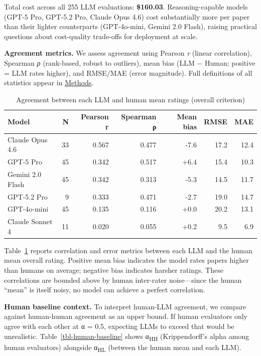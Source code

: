 \documentclass[
  11pt,
  letterpaper,
]{article}
\begin{document}
Total cost across all 255 LLM evaluations: \textbf{\$160.03}.
Reasoning-capable models (GPT-5 Pro, GPT-5.2 Pro, Claude Opus 4.6) cost
substantially more per paper than their lighter counterparts
(GPT-4o-mini, Gemini 2.0 Flash), raising practical questions about
cost-quality trade-offs for deployment at scale.

\textbf{Agreement metrics.} We assess agreement using Pearson \emph{r}
(linear correlation), Spearman \emph{ρ} (rank-based, robust to
outliers), mean bias (LLM − Human; positive = LLM rates higher), and
RMSE/MAE (error magnitude). Full definitions of all statistics appear in
\hyperref[methods]{Methods}.

\begin{longtable}[]{@{}lrrrrrr@{}}

\caption{\label{tbl-agreement}Agreement between each LLM and human mean
ratings (overall criterion)}

\tabularnewline

\toprule\noalign{}
Model & N & Pearson r & Spearman ρ & Mean bias & RMSE & MAE \\
\midrule\noalign{}
\endhead
\bottomrule\noalign{}
\endlastfoot
Claude Opus 4.6 & 33 & 0.567 & 0.477 & -7.6 & 17.2 & 12.4 \\
GPT-5 Pro & 45 & 0.342 & 0.517 & +6.4 & 15.4 & 10.3 \\
Gemini 2.0 Flash & 45 & 0.342 & 0.313 & -5.3 & 14.5 & 11.7 \\
GPT-5.2 Pro & 9 & 0.333 & 0.471 & -2.7 & 19.0 & 14.7 \\
GPT-4o-mini & 45 & 0.135 & 0.116 & +0.0 & 20.2 & 13.1 \\
Claude Sonnet 4 & 11 & 0.020 & 0.055 & +0.2 & 9.5 & 6.9 \\

\end{longtable}

Table~\ref{tbl-agreement} reports correlation and error metrics between
each LLM and the human mean overall rating. Positive mean bias indicates
the model rates papers higher than humans on average; negative bias
indicates harsher ratings. These correlations are bounded above by human
inter-rater noise---since the human ``mean'' is itself noisy, no model
can achieve a perfect correlation.

\textbf{Human baseline context.} To interpret human-LLM agreement, we
compare against human-human agreement as an upper bound. If human
evaluators only agree with each other at α = 0.5, expecting LLMs to
exceed that would be unrealistic. Table~\ref{tbl-human-baseline} shows
α\textsubscript{HH} (Krippendorff's alpha among human evaluators)
alongside α\textsubscript{HL} (between the human mean and each LLM).
\end{document}
